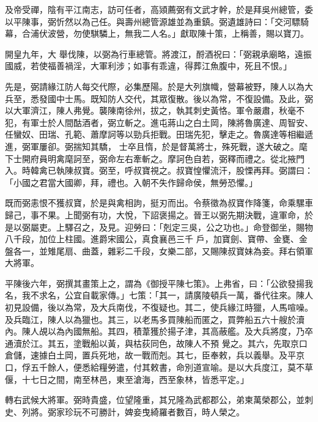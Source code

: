 \begin{pinyinscope}
 及帝受禪，陰有平江南志，訪可任者，高熲薦弼有文武才幹，於是拜吳州總管，委以平陳事，弼忻然以為己任。與壽州總管源雄並為重鎮。弼遺雄詩曰：「交河驃騎幕，合浦伏波營，勿使騏驎上，無我二人名。」獻取陳十策，上稱善，賜以寶刀。



 開皇九年，大
 舉伐陳，以弼為行車總管。將渡江，酹酒祝曰：「弼親承廟略，遠振國威，若使福善禍淫，大軍利涉；如事有乖違，得葬江魚腹中，死且不恨。」



 先是，弼請緣江防人每交代際，必集歷陽。於是大列旗幟，營幕被野，陳人以為大兵至，悉發國中士馬。既知防人交代，其眾復散。後以為常，不復設備。及此，弼以大軍濟江，陳人弗覺。襲陳南徐州，拔之，執其刺史黃恪。軍令嚴肅，秋毫不犯，有軍士於人間酤酒者，弼立斬之。進屯蔣山之白土岡，陳將魯廣達、周智安、任蠻奴、田瑞、孔範、蕭摩訶等以勁兵拒戰。田瑞先犯，擊走之。魯廣達等相繼遞進，弼軍屢卻。弼揣知其驕，
 士卒且惰，於是督萬將士，殊死戰，遂大破之。麾下士開府員明禽麾訶至，弼命左右牽斬之。摩訶色自若，弼釋而禮之。從北掖門入。時韓禽已執陳叔寶。弼至，呼叔寶視之。叔寶惶懼流汗，股慄再拜。弼謂曰：「小國之君當大國卿，拜，禮也。入朝不失作歸命侯，無勞恐懼。」



 既而弼恚恨不獲叔寶，於是與禽相訽，挺刃而出。令蔡徵為叔寶作降箋，命乘騾車歸己，事不果。上聞弼有功，大悅，下詔褒揚之。晉王以弼先期決戰，違軍命，於是以弼屬吏。上驛召之，及見。迎勞曰：「剋定三吳，公之功也。」命登御坐，賜物八千段，加位上柱國。進爵宋國公，真食襄邑三千
 戶，加寶劍、寶帶、金甕、金盤各一，並雉尾扇、曲蓋，雜彩二千段，女樂二部，又賜陳叔寶妹為妾。拜右領軍大將軍。



 平陳後六年，弼撰其畫策上之，謂為《御授平陳七策》。上弗省，曰：「公欲發揚我名，我不求名，公宜自載家傳。」七策：「其一，請廣陵頓兵一萬，番代往來。陳人初見設備，後以為常，及大兵南伐，不復疑也。其二，使兵緣江時獵，人馬喧噪。及兵臨江，陳人以為獵也。其三，以老馬多買陳船而匿之，買弊船五六十艘於瀆內。陳人覘以為內國無船。其四，積葦獲於揚子津，其高蔽艦。及大兵將度，乃卒通瀆於江。其五，塗戰船以黃，與枯荻同色，故陳人不預
 覺之。其六，先取京口倉儲，速據白土岡，置兵死地，故一戰而剋。其七，臣奉敕，兵以義舉。及平京口，俘五千餘人，便悉給糧勞遣，付其敕書，命別道宣喻。是以大兵度江，莫不草偃，十七日之間，南至林邑，東至滄海，西至象林，皆悉平定。」



 轉右武候大將軍。弼時貴盛，位望隆重，其兄隆為武都郡公，弟柬萬榮郡公，並刺史、列將。弼家珍玩不可勝計，婢妾曳綺羅者數百，時人榮之。




\end{pinyinscope}
